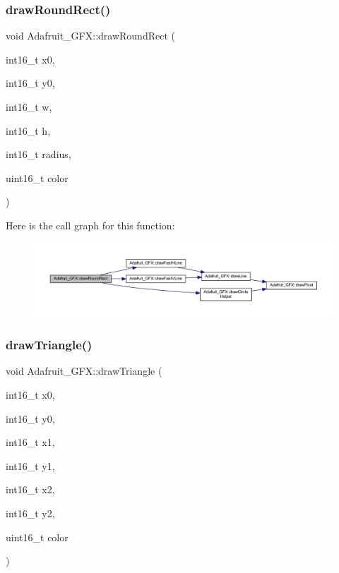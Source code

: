 \subsubsection{\texorpdfstring{draw\+Round\+Rect()}{drawRoundRect()}}
{\footnotesize\ttfamily void Adafruit\+\_\+\+G\+F\+X\+::draw\+Round\+Rect (\begin{DoxyParamCaption}\item[{int16\+\_\+t}]{x0,  }\item[{int16\+\_\+t}]{y0,  }\item[{int16\+\_\+t}]{w,  }\item[{int16\+\_\+t}]{h,  }\item[{int16\+\_\+t}]{radius,  }\item[{uint16\+\_\+t}]{color }\end{DoxyParamCaption})}

Here is the call graph for this function\+:\nopagebreak
\begin{figure}[H]
\begin{center}
\leavevmode
\includegraphics[width=350pt]{class_adafruit___g_f_x_ab496b247abec724ef80e17a30257972b_cgraph}
\end{center}
\end{figure}
\mbox{\label{class_adafruit___g_f_x_a49284b9cea16ecf8c15dfd0b51a841e6}} 
\subsubsection{\texorpdfstring{draw\+Triangle()}{drawTriangle()}}
{\footnotesize\ttfamily void Adafruit\+\_\+\+G\+F\+X\+::draw\+Triangle (\begin{DoxyParamCaption}\item[{int16\+\_\+t}]{x0,  }\item[{int16\+\_\+t}]{y0,  }\item[{int16\+\_\+t}]{x1,  }\item[{int16\+\_\+t}]{y1,  }\item[{int16\+\_\+t}]{x2,  }\item[{int16\+\_\+t}]{y2,  }\item[{uint16\+\_\+t}]{color }\end{DoxyParamCaption})}

